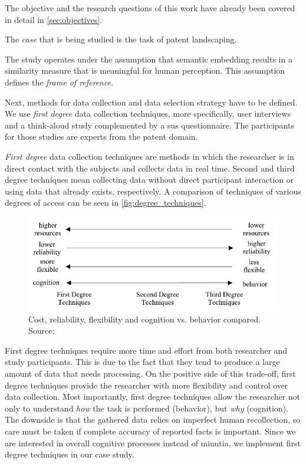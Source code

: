 The objective and the research questions of this work have already been covered in detail in \autoref{sec:objectives}.

The \textit{case} that is being studied is the task of patent landscaping.

The study operates under the assumption that semantic embedding results in a similarity measure that is meaningful for human perception. 
This assumption defines the \textit{frame of reference}.

Next, methods for data collection and data selection strategy have to be defined.
We use \textit{first degree} data collection techniques, more specifically, user interviews and a think-aloud study complemented by a \gls{sus} questionnaire.
The participants for those studies are experts from the patent domain.

\textit{First degree} data collection techniques are methods in which the researcher is in direct contact with the subjects and collects data in real time\cite{Lethbridge2005}.
Second and third degree techniques mean collecting data without direct participant interaction or using data that already exists, respectively.
A comparison of techniques of various degrees of access can be seen in \autoref{fig:degree_techniques}.

\begin{figure}[h]
\centering
\includegraphics{img/degree_techniques}
\caption{Cost, reliability, flexibility and cognition vs. behavior compared. Source: \cite{Lethbridge2005}}
\label{fig:degree_techniques}
\end{figure}
First degree techniques require more time and effort from both researcher and study participants.
This is due to the fact that they tend to produce a large amount of data that needs processing.
On the positive side of this trade-off, first degree techniques provide the researcher with more flexibility and control over data collection.
Most importantly, first degree techniques allow the researcher not only to understand \textit{how} the task is performed (behavior), but \textit{why} (cognition).
The downside is that the gathered data relies on imperfect human recollection, so care must be taken if complete accuracy of reported facts is important.
Since we are interested in overall cognitive processes instead of minutia, we implement first degree techniques in our case study.

